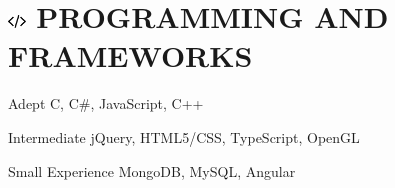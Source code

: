 \documentclass[10pt]{tccv}
\begin{document}
\section{\includegraphics[height=10pt, keepaspectratio=true]{code} PROGRAMMING AND FRAMEWORKS}

\begin{factlist}

\item{Adept}
     {C, C\#, JavaScript, C++}
     
\item{Intermediate}
	 {jQuery, HTML5/CSS, TypeScript, OpenGL}

\item{Small Experience}
     {MongoDB, MySQL, Angular}

\end{factlist}
\end{document}
